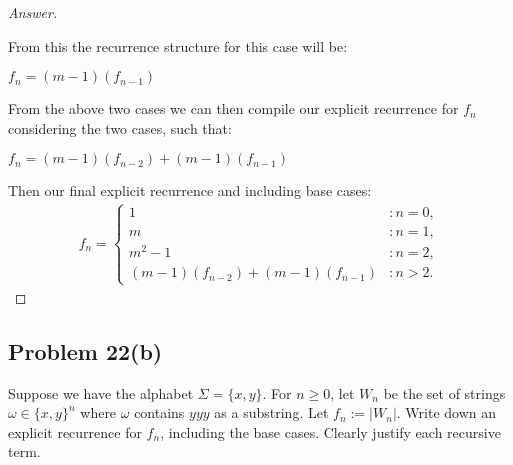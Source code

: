 \documentclass[11pt]{article}
\theoremstyle{definition}
\theoremstyle{definition}
\theoremstyle{definition}
\begin{document}
\begin{proof}[Answer]
\begin{itemize}
From this the recurrence structure for this case will be: \\
\begin{center}
$f_n = (m-1)(f_{n-1})$
\end{center}
\end{itemize}

From the above two cases we can then compile our explicit recurrence for $f_n$ considering the two cases, such that: \\
\begin{center}
$f_n = (m-1)(f_{n-2}) + (m-1)(f_{n-1})$
\end{center}
Then our final explicit recurrence and including base cases: 
\begin{align*}
f_n = \begin{cases}
1 & : n = 0, \\
m & : n = 1, \\
m^2 - 1 & : n = 2, \\
(m-1)(f_{n-2}) + (m-1)(f_{n-1}) & : n > 2.
\end{cases}
\end{align*}
\end{proof}

\newpage
\subsection*{Problem 22(b)}

Suppose we have the alphabet $\Sigma = \{x, y\}$. For $n \geq 0$, let $W_{n}$ be the set of strings $\omega \in \{x, y\}^{n}$ where $\omega$ contains $yyy$ as a substring. Let $f_{n} := |W_{n}|$. Write down an explicit recurrence for $f_{n}$, including the base cases. Clearly justify each recursive term.
\end{document}

